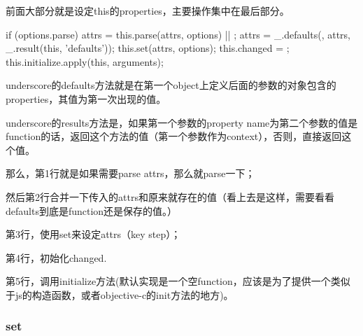 前面大部分就是设定this的properties，主要操作集中在最后部分。

\begin{JavaScript}
    if (options.parse) attrs = this.parse(attrs, options) || {};
    attrs = _.defaults({}, attrs, _.result(this, 'defaults'));
    this.set(attrs, options);
    this.changed = {};
    this.initialize.apply(this, arguments);
\end{JavaScript}

underscore的defaults方法就是在第一个object上定义后面的参数的对象包含的properties，其值为第一次出现的值。

underscore的results方法是，如果第一个参数的property name为第二个参数的值是function的话，返回这个方法的值（第一个参数作为context），否则，直接返回这个值。

那么，第1行就是如果需要parse attrs，那么就parse一下；

然后第2行合并一下传入的attrs和原来就存在的值（看上去是这样，需要看看defaults到底是function还是保存的值。）

第3行，使用set来设定attrs（key step）；

第4行，初始化changed.

第5行，调用initialize方法(默认实现是一个空function，应该是为了提供一个类似于js的构造函数，或者objective-c的init方法的地方)。



\subsubsection{set}

